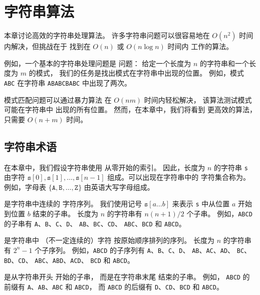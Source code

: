 \chapter{字符串算法}

本章讨论高效的字符串处理算法。
许多字符串问题可以很容易地在
$O(n^2)$ 时间内解决，但挑战在于
找到在 $O(n)$ 或 $O(n \log n)$ 时间内
工作的算法。


例如，一个基本的字符串处理问题是
问题：
给定一个长度为 $n$ 的字符串和一个长度为 $m$ 的模式，
我们的任务是找出模式在字符串中出现的位置。
例如，模式 \texttt{ABC} 在字符串
\texttt{ABABCBABC} 中出现了两次。

模式匹配问题可以通过暴力算法
在 $O(nm)$ 时间内轻松解决，
该算法测试模式可能在字符串中
出现的所有位置。
然而，在本章中，我们将看到
更高效的算法，只需要
$O(n+m)$ 时间。


\section{字符串术语}


在本章中，我们假设字符串使用
从零开始的索引。
因此，长度为 $n$ 的字符串 \texttt{s}
由字符
$\texttt{s}[0],\texttt{s}[1],\ldots,\texttt{s}[n-1]$
组成。可以出现在字符串中的
字符集合称为。
例如，字母表
$\{\texttt{A},\texttt{B},\ldots,\texttt{Z}\}$
由英语大写字母组成。


是字符串中连续的
字符序列。
我们使用记号 $\texttt{s}[a \ldots b]$
来表示 \texttt{s} 中从位置 $a$ 开始
到位置 $b$ 结束的子串。
长度为 $n$ 的字符串有 $n(n+1)/2$ 个子串。
例如，\texttt{ABCD} 的子串有
\texttt{A}、\texttt{B}、\texttt{C}、\texttt{D}、
\texttt{AB}、\texttt{BC}、\texttt{CD}、
\texttt{ABC}、\texttt{BCD} 和 \texttt{ABCD}。


是字符串中
（不一定连续的）字符
按原始顺序排列的序列。
长度为 $n$ 的字符串有 $2^n-1$ 个子序列。
例如，\texttt{ABCD} 的子序列有
\texttt{A}、\texttt{B}、\texttt{C}、\texttt{D}、
\texttt{AB}、\texttt{AC}、\texttt{AD}、
\texttt{BC}、\texttt{BD}、\texttt{CD}、
\texttt{ABC}、\texttt{ABD}、\texttt{ACD}、
\texttt{BCD} 和 \texttt{ABCD}。


是从字符串开头
开始的子串，
而是在字符串末尾
结束的子串。
例如，
\texttt{ABCD} 的前缀有
\texttt{A}、\texttt{AB}、\texttt{ABC} 和 \texttt{ABCD}，
而 \texttt{ABCD} 的后缀有
\texttt{D}、\texttt{CD}、\texttt{BCD} 和 \texttt{ABCD}。

